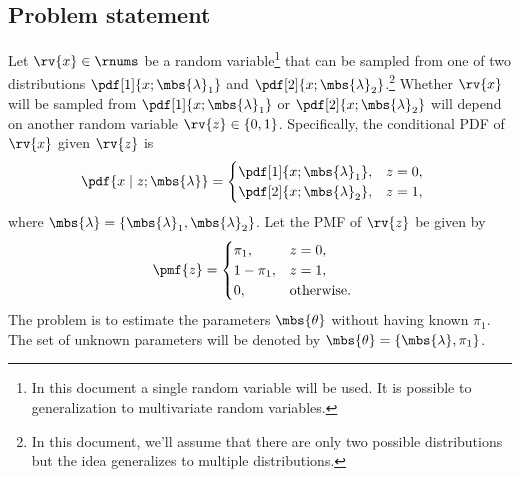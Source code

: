 \subsection{Problem statement}
Let $\rv{x}\in\rnums$ be a random variable\footnote{In this document a single random variable will be used. It is possible to generalization to multivariate random variables.} that can be sampled from one of two distributions $\pdf[1]{x; \mbs{\lambda}_{1}}$ and $\pdf[2]{x; \mbs{\lambda}_{2}}$.\footnote{In this document, we'll assume that there are only two possible distributions but the idea generalizes to multiple distributions.}
Whether $\rv{x}$ will be sampled from $\pdf[1]{x; \mbs{\lambda}_{1}}$ or $\pdf[2]{x; \mbs{\lambda}_{2}}$ will depend on another random variable $\rv{z}\in\left\{ 0, 1 \right\}$. Specifically, the conditional PDF of $\rv{x}$ given $\rv{z}$ is
\begin{align}
    \label{eq:PDF x given z}
    \pdf{x\mid z; \mbs{\lambda} } &=
    \begin{cases}
        \pdf[1]{x; \mbs{\lambda}_{1}}, & z=0,\\
        \pdf[2]{x; \mbs{\lambda}_{2}}, & z=1,
    \end{cases}
\end{align}
where $\mbs{\lambda} = \{\mbs{\lambda}_{1}, \mbs{\lambda}_{2}\}$. Let the PMF of $\rv{z}$ be given by
\begin{align}
    \label{eq:PMF z}
    \pmf{z} &= 
    \begin{cases}
        \pi_{1}, & z=0,\\
        1-\pi_{1}, & z=1,\\
        0, & \text{otherwise}.
    \end{cases}
\end{align}
The problem is to estimate the parameters $\mbs{\theta}$ without having known $\pi_{1}$. The set of unknown parameters will be denoted by $\mbs{\theta} = \left\{ \mbs{\lambda}, \pi_{1} \right\}$. 
